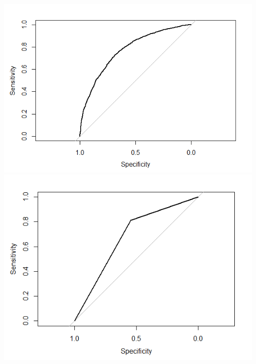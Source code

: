 \documentclass[11pt,preprint, authoryear]{elsarticle}
\let\origfigure\figure
\let\endorigfigure\endfigure
\renewenvironment{figure}[1][2] {
    \expandafter\origfigure\expandafter[H]
} {
    \endorigfigure
}
\numberwithin{equation}{section}
\numberwithin{figure}{section}
\numberwithin{table}{section}
\begin{document}
\begin{figure}[H]

{\centering \includegraphics[width=0.49\linewidth,height=0.3\textheight]{Figures/rf3_roc} \includegraphics[width=0.49\linewidth,height=0.3\textheight]{Figures/gbm1_roc} 

}

\caption{\label{rf3_roc} ROC curves - RF (left), GBM (right)}\label{fig:rf3_roc}
\end{figure}


\end{document}
